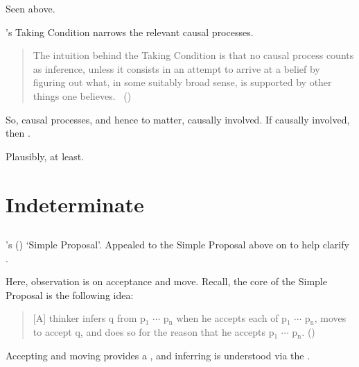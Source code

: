 \begin{note}
  Seen above.

  \citeauthor{Boghossian:2014aa}'s Taking Condition narrows the relevant causal processes.

  \begin{quote}
    The intuition behind the Taking Condition is that no causal process counts as inference, unless it consists in an attempt to arrive at a belief by ﬁguring out what, in some suitably broad sense, is supported by other things one believes.
    \mbox{ }\hfill\mbox{(\citeyear[5]{Boghossian:2014aa})}
  \end{quote}

  So, causal processes, and hence to matter, causally involved.
  If causally involved, then \wit{}.
\end{note}

\begin{note}
  Plausibly, at least.

  
\end{note}

\section{Indeterminate}
\label{cha:var:sec:indeterminate}

\subsection{\textcite{Wright:2014tt}}

\begin{note}
  \citeauthor{Wright:2014tt}'s (\citeyear{Wright:2014tt}) `Simple Proposal'.
  Appealed to the Simple Proposal above on  to help clarify \supportI{}.

  Here, observation is on acceptance and move.
  Recall, the core of the Simple Proposal is the following idea:

  \begin{quote}
    [A] thinker infers q from p\(_{1}\) \(\cdots\) p\(_{\text{n}}\) when he accepts each of p\(_{1}\) \(\cdots\) p\(_{\text{n}}\), moves to accept q, and does so for the reason that he accepts p\(_{1}\) \(\cdots\) p\(_{\text{n}}\).%
    \mbox{}\hfill\mbox{(\citeyear[33]{Wright:2014tt})}
  \end{quote}

  Accepting and moving provides a \wit{}, and inferring is understood via the \wit{}.
\end{note}

